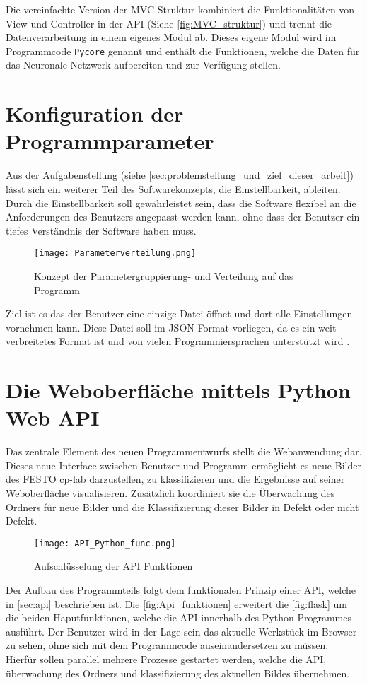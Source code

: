Die vereinfachte Version der \ac{MVC} Struktur kombiniert die Funktionalitäten von View und Controller in der \ac{API} (Siehe \autoref{fig:MVC_struktur}) und trennt die Datenverarbeitung in einem eigenes Modul ab. Dieses eigene Modul wird im Programmcode \texttt{Pycore} genannt und enthält die Funktionen, welche die Daten für das Neuronale Netzwerk aufbereiten und zur Verfügung stellen.

\section{Konfiguration der Programmparameter} \label{sec:konfiguration}

Aus der Aufgabenstellung (siehe \autoref{sec:problemstellung_und_ziel_dieser_arbeit}) lässt sich ein weiterer Teil des Softwarekonzepts, die Einstellbarkeit, ableiten.
Durch die Einstellbarkeit soll gewährleistet sein, dass die Software flexibel an die Anforderungen des Benutzers angepasst werden kann, ohne dass der Benutzer ein tiefes Verständnis der Software haben muss.

\begin{figure}[H]
    \centering
    \texttt{[image: Parameterverteilung.png]}
    \caption{Konzept der Parametergruppierung- und Verteilung auf das Programm} 
    \label{fig:json_example}
\end{figure}

Ziel ist es das der Benutzer eine einzige Datei öffnet und dort alle Einstellungen vornehmen kann. 
Diese Datei soll im \ac{JSON}-Format vorliegen, da es ein weit verbreitetes Format ist und von vielen Programmiersprachen unterstützt wird \cite{gur_diskussion_2024}.


\section{Die Weboberfläche mittels Python Web API} \label{sec:weboberflaeche}

Das zentrale Element des neuen Programmentwurfs stellt die Webanwendung dar. Dieses neue Interface zwischen Benutzer und Programm ermöglicht es neue Bilder des FESTO \ac{cp-lab} darzustellen, zu klassifizieren und die Ergebnisse auf seiner Weboberfläche visualisieren.
Zusätzlich koordiniert sie die Überwachung des Ordners für neue Bilder und die Klassifizierung dieser Bilder in Defekt oder nicht Defekt.

\begin{figure}[H]
    \centering
    \texttt{[image: API\_Python\_func.png]}
    \caption{Aufschlüsselung der API Funktionen} 
    \label{fig:Api_funktionen}
\end{figure}

Der Aufbau des Programmteils folgt dem funktionalen Prinzip einer \ac{API}, welche in \autoref{sec:api} beschrieben ist. Die \autoref{fig:Api_funktionen} erweitert die \autoref{fig:flask} um die beiden Haputfunktionen, welche die API innerhalb des Python Programmes ausführt. Der Benutzer wird in der Lage sein das aktuelle Werkstück im Browser zu sehen, ohne sich mit dem Programmcode auseinandersetzen zu müssen. Hierfür sollen parallel mehrere Prozesse gestartet werden, welche die API, überwachung des Ordners und klassifizierung des aktuellen Bildes übernehmen.